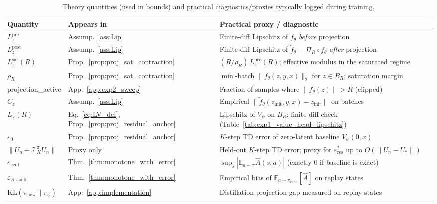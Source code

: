 \documentclass{article}
\theoremstyle{plain}
\theoremstyle{definition}
\theoremstyle{remark}
\newcommand{\E}{\mathbb{E}}
\newcommand{\KL}{\mathrm{KL}}
\begin{document}
\begin{table}[t]
\caption{Theory quantities (used in bounds) and practical diagnostics/proxies typically logged during training.}
\label{tab:diagnostics}
\centering
\small
\begin{tabular}{@{}lll@{}}
\toprule
Quantity & Appears in & Practical proxy / diagnostic \\
\midrule
$L_z^{\mathrm{pre}}$ & Assump.~\ref{ass:Lip} & Finite-diff Lipschitz of $f_\theta$ \emph{before} projection \\
$L_z^{\mathrm{post}}$ & Assump.~\ref{ass:Lip} & Finite-diff Lipschitz of $\tilde f_\theta{=}\Pi_R\circ f_\theta$ \emph{after} projection \\
$L_z^{\mathrm{sat}}(R)$ & Prop.~\ref{prop:proj_sat_contraction} & $(R/\rho_R)\,L_z^{\mathrm{pre}}(R)$; effective modulus in the saturated regime \\
$\rho_R$ & Prop.~\ref{prop:proj_sat_contraction} & $\min$-batch $\|f_\theta(z,y,x)\|_2$ for $z\in B_R$; saturation margin \\
projection\_active & App.~\ref{app:exp2_sweep} & Fraction of samples where $\|f_\theta(z)\|>R$ (clipped) \\
$C_z$ & Assump.~\ref{ass:Lip} & Empirical $\|\tilde f_\theta(z_{\mathrm{init}},y,x)-z_{\mathrm{init}}\|$ on batches \\
$L_V(R)$ & Eq.~\eqref{eq:LV_def}, Prop.~\ref{prop:proj_residual_anchor} & Lipschitz of $V_\psi$ on $B_R$; finite-diff check (Table~\ref{tab:exp1_value_head_lipschitz}) \\
$\varepsilon_0$ & Prop.~\ref{prop:proj_residual_anchor} & $K$-step TD error of zero-latent baseline $V_\psi(0,x)$ \\
$\|U_n-\mathcal{T}^\pi_K U_n\|$ & Proxy only & Held-out $K$-step TD error; proxy for $\varepsilon_{\mathrm{res}}^*$ up to $O(\|U_n-U_*\|)$ \\
$\varepsilon_{\mathrm{cent}}$ & Thm.~\ref{thm:monotone_with_error} & $\sup_s|\E_{a\sim\pi}\widehat A(s,a)|$ (exactly $0$ if baseline is exact) \\
$\varepsilon_{A,\mathrm{cand}}$ & Thm.~\ref{thm:monotone_with_error} & Empirical bias of $\E_{a\sim\pi_{\mathrm{cand}}}[\widehat A]$ on replay states \\
$\KL(\pi_{\mathrm{new}}\|\pi_\phi)$ & App.~\ref{app:implementation} & Distillation projection gap measured on replay states \\
\bottomrule
\end{tabular}
\end{table}
\end{document}
